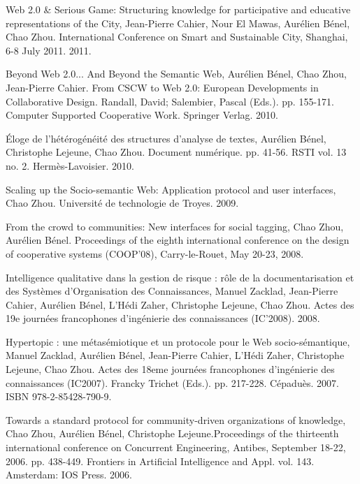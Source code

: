 \documentclass[10pt]{article}
\renewcommand\emph[1]{#1}
\renewcommand{\section}[1]{\pagebreak[3]%
    \vspace{1.3\baselineskip}%
    \phantomsection\addcontentsline{toc}{section}{#1}%
    \noindent\llap{\scshape\smash{\parbox[t]{\marginparwidth}{\hyphenpenalty=10000\raggedright #1}}}%
    \vspace{-\baselineskip}\par}
\begin{document}
\section{Publications}

\begin{bibenum}
    \item \emph{Web 2.0 \& Serious Game: Structuring knowledge for participative and educative representations of the City}, Jean-Pierre Cahier, Nour El Mawas, {Aur{\'e}lien} {B{\'e}nel}, Chao Zhou.  International Conference on Smart and Sustainable City, Shanghai, 6-8 July 2011. 2011.

    \item Beyond Web 2.0... And Beyond the Semantic Web, {Aur{\'e}lien} {B{\'e}nel}, Chao Zhou, Jean-Pierre Cahier. From CSCW to Web 2.0: European Developments in Collaborative Design. Randall, David; Salembier, Pascal (Eds.). pp. 155-171. Computer Supported Cooperative Work. Springer Verlag. 2010.  

    \item {\'E}loge de l'h{\'e}t{\'e}rog{\'e}n{\'e}it{\'e} des structures d'analyse de textes, {Aur{\'e}lien} {B{\'e}nel}, \\Christophe Lejeune, Chao Zhou. Document num{\'e}rique. pp. 41-56. RSTI vol. 13 no. 2. Herm{\`e}s-Lavoisier. 2010. 

    \item Scaling up the Socio-semantic Web: Application protocol and user interfaces, Chao Zhou. Universit{\'e} de technologie de Troyes. 2009. 
    
    \item From the crowd to communities: New interfaces for social tagging, Chao Zhou, {Aur{\'e}lien} {B{\'e}nel}. Proceedings of the eighth international conference on the design of cooperative systems (COOP'08), Carry-le-Rouet, May 20-23, 2008. 
    
    \item Intelligence qualitative dans la gestion de risque : r{\^o}le de la documentarisation et des Syst{\`e}mes d’Organisation des Connaissances, Manuel Zacklad, Jean-Pierre Cahier,  {Aur{\'e}lien} {B{\'e}nel}, L'H{\'e}di Zaher, Christophe Lejeune, Chao Zhou. Actes des 19e journ{\'e}es francophones d'ing{\'e}nierie des connaissances (IC'2008). 2008.
    
    \item Hypertopic : une m{\'e}tas{\'e}miotique et un protocole pour le Web socio-s{\'e}mantique, Manuel Zacklad, Aur{\'e}lien B{\'e}nel, Jean-Pierre Cahier, L'H{\'e}di Zaher, Christophe Lejeune, Chao Zhou. Actes des 18eme journ{\'e}es francophones d'ing{\'e}nierie des connaissances (IC2007). Francky Trichet (Eds.). pp. 217-228. C{\'e}padu{\`e}s. 2007. ISBN 978-2-85428-790-9. 
    
    \item Towards a standard protocol for community-driven organizations of knowledge, Chao Zhou, Aur{\'e}lien B{\'e}nel, Christophe Lejeune.Proceedings of the thirteenth international conference on Concurrent Engineering, Antibes, September 18-22, 2006. pp. 438-449. Frontiers in Artificial Intelligence and Appl. vol. 143. Amsterdam: IOS Press. 2006.
    
\end{bibenum}
\end{document}
